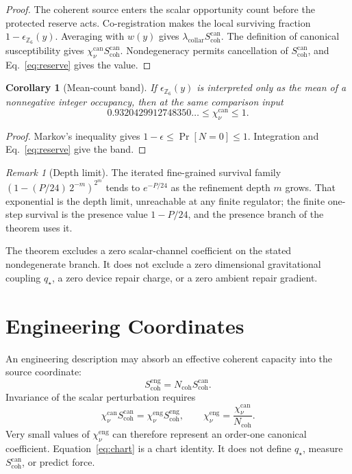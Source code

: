 \documentclass[11pt]{article}
\numberwithin{equation}{section}
\newtheorem{corollary}[theorem]{Corollary}
\theoremstyle{remark}
\newtheorem{remark}[theorem]{Remark}
\newcommand{\chican}{\chi_\nu^{\mathrm{can}}}
\newcommand{\chieng}{\chi_\nu^{\mathrm{eng}}}
\newcommand{\scohcan}{S_{\mathrm{coh}}^{\mathrm{can}}}
\newcommand{\scoheng}{S_{\mathrm{coh}}^{\mathrm{eng}}}
\newcommand{\Ncoh}{N_{\mathrm{coh}}}
\newcommand{\lambdac}{\lambda_{\mathrm{collar}}}
\begin{document}
\begin{proof}
The coherent source enters the scalar opportunity count before the protected
reserve acts. Co-registration makes the local surviving fraction
\(1-\epsilon_{\mathbb Z_6}(y)\). Averaging with \(w(y)\) gives
\(\lambdac\scohcan\). The definition of canonical susceptibility gives
\(\chican\scohcan\). Nondegeneracy permits cancellation of \(\scohcan\), and
Eq.~\eqref{eq:reserve} gives the value.
\end{proof}

\begin{corollary}[Mean-count band]
If \(\epsilon_{\mathbb Z_6}(y)\) is interpreted only as the mean of a
nonnegative integer occupancy, then at the same comparison input
\begin{equation}
\boxed{0.9320429912748350\ldots\le\chican\le1}.
\label{eq:band}
\end{equation}
\end{corollary}

\begin{proof}
Markov's inequality gives
\(1-\epsilon\le\Pr[N=0]\le1\). Integration and
Eq.~\eqref{eq:reserve} give the band.
\end{proof}

\begin{remark}[Depth limit]
The iterated fine-grained survival family
\((1-(P/24)\,2^{-m})^{2^m}\) tends to \(e^{-P/24}\) as the refinement depth
\(m\) grows. That exponential is the depth limit, unreachable at any finite
regulator; the finite one-step survival is the presence value \(1-P/24\),
and the presence branch of the theorem uses it.
\end{remark}

The theorem excludes a zero scalar-channel coefficient on the stated
nondegenerate branch. It does not exclude a zero dimensional gravitational
coupling \(q_\star\), a zero device repair charge, or a zero ambient repair
gradient.

\section{Engineering Coordinates}

An engineering description may absorb an effective coherent capacity into
the source coordinate:
\begin{equation}
\scoheng=\Ncoh\scohcan.
\end{equation}
Invariance of the scalar perturbation requires
\begin{equation}
\chican\scohcan=\chieng\scoheng,
\qquad
\boxed{\chieng=\frac{\chican}{\Ncoh}}.
\label{eq:chart}
\end{equation}
Very small values of \(\chieng\) can therefore represent an order-one
canonical coefficient. Equation~\eqref{eq:chart} is a chart identity. It does
not define \(q_\star\), measure \(\scohcan\), or predict force.
\end{document}
